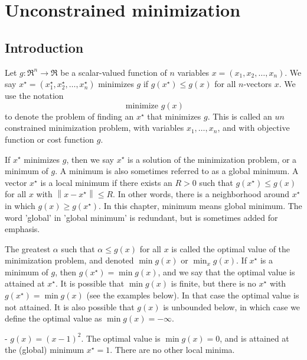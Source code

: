 \chapter{Unconstrained minimization}

\section{Introduction}

Let $ g: \mathfrak{R}^{n} \rightarrow \mathfrak{R} $ be a scalar-valued function of $ n $ variables $ x=\left(x_{1}, x_{2}, \ldots, x_{n}\right) . $ We say $ x^{\star}=\left(x_{1}^{\star}, x_{2}^{\star}, \ldots, x_{n}^{\star}\right) $ minimizes $ g $ if $ g\left(x^{\star}\right) \leq g(x) $ for all $ n $-vectors $ x $. We use the notation
\begin{equation}
\text { minimize } g(x)
\end{equation}
to denote the problem of finding an $ x^{\star} $ that minimizes $ g $. This is called an $ u n $ constrained minimization problem, with variables $ x_{1}, \ldots, x_{n} $, and with objective function or cost function $ g $.

If $ x^{\star} $ minimizes $ g $, then we say $ x^{\star} $ is a solution of the minimization problem, or a minimum of $ g . $ A minimum is also sometimes referred to as a global minimum. A vector $ x^{\star} $ is a local minimum if there exists an $ R>0 $ such that $ g\left(x^{\star}\right) \leq g(x) $ for all $ x $ with $ \left\|x-x^{\star}\right\| \leq R $. In other words, there is a neighborhood around $ x^{\star} $ in which $ g(x) \geq g\left(x^{\star}\right) $. In this chapter, minimum means global minimum. The word 'global' in 'global minimum' is redundant, but is sometimes added for emphasis.

The greatest $ \alpha $ such that $ \alpha \leq g(x) $ for all $ x $ is called the optimal value of the minimization problem, and denoted
$ \min g(x) $
or $ \min _{x} g(x) $. If $ x^{\star} $ is a minimum of $ g $, then $ g\left(x^{\star}\right)=\min g(x) $, and we say that the optimal value is attained at $ x^{\star} $. It is possible that $ \min g(x) $ is finite, but there is no $ x^{\star} $ with $ g\left(x^{\star}\right)=\min g(x) $ (see the examples below). In that case the optimal value is not attained. It is also possible that $ g(x) $ is unbounded below, in which case we define the optimal value as $ \min g(x)=-\infty $.

\begin{example}
    - $ g(x)=(x-1)^{2} $. The optimal value is $ \min g(x)=0 $, and is attained at the (global) minimum $ x^{\star}=1 $. There are no other local minima.
\end{example}

